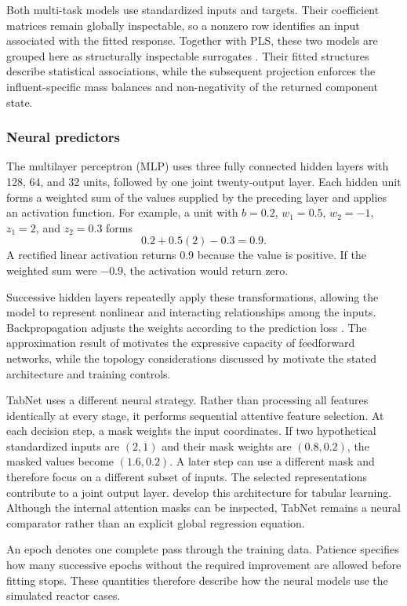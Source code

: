 Both multi-task models use standardized inputs and targets. Their coefficient matrices remain globally inspectable, so a nonzero row identifies an input associated with the fitted response. Together with PLS, these two models are grouped here as structurally inspectable surrogates \citep{Rudin2019}. Their fitted structures describe statistical associations, while the subsequent projection enforces the influent-specific mass balances and non-negativity of the returned component state.

\subsubsection{Neural predictors}

The multilayer perceptron (MLP) uses three fully connected hidden layers with 128, 64, and 32 units, followed by one joint twenty-output layer. Each hidden unit forms a weighted sum of the values supplied by the preceding layer and applies an activation function. For example, a unit with
$b=0.2$, $w_1=0.5$, $w_2=-1$, $z_1=2$, and $z_2=0.3$
forms
\[
0.2+0.5(2)-0.3=0.9.
\]
A rectified linear activation returns 0.9 because the value is positive. If the weighted sum were $-0.9$, the activation would return zero.

Successive hidden layers repeatedly apply these transformations, allowing the model to represent nonlinear and interacting relationships among the inputs. Backpropagation adjusts the weights according to the prediction loss \citep{Rumelhart1986}. The approximation result of \citet{Hornik1989} motivates the expressive capacity of feedforward networks, while the topology considerations discussed by \citet{Curteanu2011} motivate the stated architecture and training controls.

TabNet uses a different neural strategy. Rather than processing all features identically at every stage, it performs sequential attentive feature selection. At each decision step, a mask weights the input coordinates. If two hypothetical standardized inputs are $(2,1)$ and their mask weights are $(0.8,0.2)$, the masked values become $(1.6,0.2)$. A later step can use a different mask and therefore focus on a different subset of inputs. The selected representations contribute to a joint output layer. \citet{ArikPfister2021} develop this architecture for tabular learning. Although the internal attention masks can be inspected, TabNet remains a neural comparator rather than an explicit global regression equation.

An epoch denotes one complete pass through the training data. Patience specifies how many successive epochs without the required improvement are allowed before fitting stops. These quantities therefore describe how the neural models use the simulated reactor cases.

